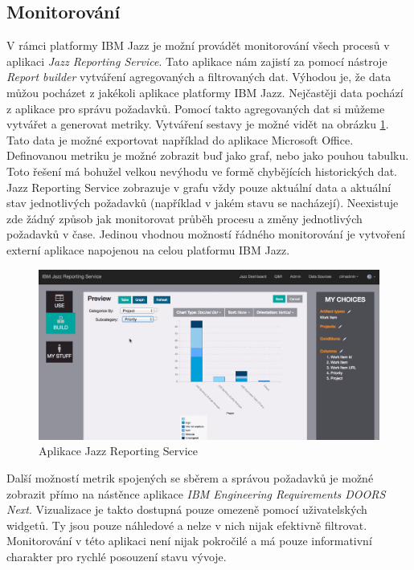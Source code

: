 \documentclass[czech,master]{diploma}
\begin{document}
\subsection{Monitorování}
V rámci platformy IBM Jazz je možní provádět monitorování všech procesů v aplikaci \textit{Jazz Reporting Service}. Tato aplikace nám zajistí za pomocí nástroje \textit{Report builder} vytváření agregovaných a filtrovaných dat. Výhodou je, že data můžou pocházet z jakékoli aplikace platformy IBM Jazz. Nejčastěji data pochází z aplikace pro správu požadavků. Pomocí takto agregovaných dat si můžeme vytvářet a generovat metriky. Vytváření sestavy je možné vidět na obrázku \ref{fig:ibm_reporting_service}. Tato data je možné exportovat například do aplikace Microsoft Office. Definovanou metriku je možné zobrazit buď jako graf, nebo jako pouhou tabulku. Toto řešení má bohužel velkou nevýhodu ve formě chybějících historických dat. Jazz Reporting Service zobrazuje v grafu vždy pouze aktuální data a aktuální stav jednotlivých požadavků (například v jakém stavu se nacházejí). Neexistuje zde žádný způsob jak monitorovat průběh procesu a změny jednotlivých požadavků v čase. Jedinou vhodnou možností řádného monitorování je vytvoření externí aplikace napojenou na celou platformu IBM Jazz.

\begin{figure}[!ht]
    \centering
    \includegraphics[width=1\textwidth]{Diplomka/Figures/ibm_reporting_service.png}
    \caption{Aplikace Jazz Reporting Service}
    \label{fig:ibm_reporting_service}
\end{figure}

Další možností metrik spojených se sběrem a správou požadavků je možné zobrazit přímo na nástěnce aplikace \textit{IBM Engineering Requirements DOORS Next}. Vizualizace je takto dostupná pouze omezeně pomocí uživatelských widgetů. Ty jsou pouze náhledové a nelze v nich nijak efektivně filtrovat. Monitorování v této aplikaci není nijak pokročilé a má pouze informativní charakter pro rychlé posouzení stavu vývoje.
\end{document}
